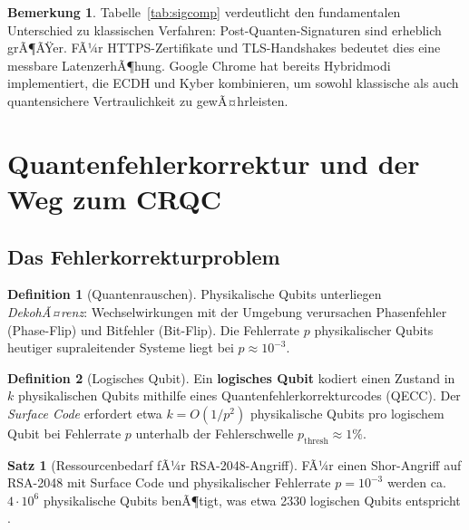 ﻿\documentclass[a4paper,12pt]{article}
\theoremstyle{definition}
\newtheorem{definition}{Definition}[section]
\newtheorem{bemerkung}{Bemerkung}[section]
\newtheorem{satz}{Satz}[section]
\begin{document}
\begin{bemerkung}
Tabelle~\ref{tab:sigcomp} verdeutlicht den fundamentalen Unterschied zu klassischen
Verfahren: Post-Quanten-Signaturen sind erheblich grÃ¶ÃŸer. FÃ¼r HTTPS-Zertifikate
und TLS-Handshakes bedeutet dies eine messbare LatenzerhÃ¶hung. Google Chrome
hat bereits Hybridmodi implementiert, die ECDH und Kyber kombinieren, um
sowohl klassische als auch quantensichere Vertraulichkeit zu gewÃ¤hrleisten.
\end{bemerkung}

\section{Quantenfehlerkorrektur und der Weg zum CRQC}

\subsection{Das Fehlerkorrekturproblem}

\begin{definition}[Quantenrauschen]
Physikalische Qubits unterliegen \emph{DekohÃ¤renz}: Wechselwirkungen mit der
Umgebung verursachen Phasenfehler (Phase-Flip) und Bitfehler (Bit-Flip).
Die Fehlerrate $p$ physikalischer Qubits heutiger supraleitender Systeme
liegt bei $p \approx 10^{-3}$.
\end{definition}

\begin{definition}[Logisches Qubit]
Ein \textbf{logisches Qubit} kodiert einen Zustand in $k$ physikalischen Qubits
mithilfe eines Quantenfehlerkorrekturcodes (QECC). Der \emph{Surface Code} \cite{FC09}
erfordert etwa $k = O(1/p^2)$ physikalische Qubits pro logischem Qubit
bei Fehlerrate $p$ unterhalb der Fehlerschwelle $p_\mathrm{thresh} \approx 1\%$.
\end{definition}

\begin{satz}[Ressourcenbedarf fÃ¼r RSA-2048-Angriff]
\label{satz:ressource}
FÃ¼r einen Shor-Angriff auf RSA-2048 mit Surface Code und physikalischer Fehlerrate
$p = 10^{-3}$ werden ca.\ $4 \cdot 10^6$ physikalische Qubits benÃ¶tigt,
was etwa 2330 logischen Qubits entspricht \cite{GE21}.
\end{satz}
\end{document}
